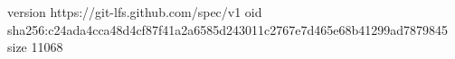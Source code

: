 version https://git-lfs.github.com/spec/v1
oid sha256:c24ada4cca48d4cf87f41a2a6585d243011c2767e7d465e68b41299ad7879845
size 11068
